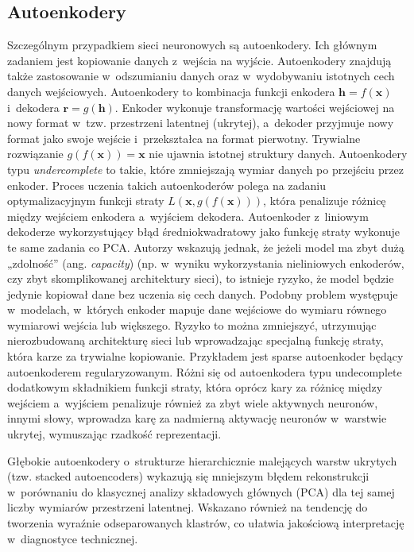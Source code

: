\subsection{Autoenkodery}

Szczególnym przypadkiem sieci neuronowych są autoenkodery. Ich głównym zadaniem jest kopiowanie danych z~wejścia na wyjście. Autoenkodery znajdują także zastosowanie w~odszumianiu danych oraz w~wydobywaniu istotnych cech danych wejściowych. Autoenkodery to kombinacja funkcji enkodera $\mathbf{h} = f(\mathbf{x})$ i~dekodera $\mathbf{r} = g(\mathbf{h})$. Enkoder wykonuje transformację wartości wejściowej na nowy format w~tzw. przestrzeni latentnej (ukrytej), a~dekoder przyjmuje nowy format jako swoje wejście i~przekształca na format pierwotny.
Trywialne rozwiązanie $g(f(\mathbf{x}))=\mathbf{x}$ nie ujawnia istotnej struktury danych. 
Autoenkodery typu \textit{undercomplete} to takie, które zmniejszają wymiar danych po przejściu przez enkoder. Proces uczenia takich autoenkoderów polega na zadaniu optymalizacyjnym funkcji straty $L(\mathbf{x},g(f(\mathbf{x})))$, która penalizuje różnicę między wejściem enkodera a~wyjściem dekodera. Autoenkoder z~liniowym dekoderze wykorzystujący błąd średniokwadratowy jako funkcję straty wykonuje te same zadania co PCA.
Autorzy \cite{deeplearningbook} wskazują jednak, że jeżeli model ma zbyt dużą „zdolność” (ang. \textit{capacity}) (np. w~wyniku wykorzystania nieliniowych enkoderów, czy zbyt skomplikowanej architektury sieci), to istnieje ryzyko, że model będzie jedynie kopiował dane bez uczenia się cech danych. Podobny problem występuje w~modelach, w~których enkoder mapuje dane wejściowe do wymiaru równego wymiarowi wejścia lub większego. Ryzyko to można zmniejszyć, utrzymując nierozbudowaną architekturę sieci lub wprowadzając specjalną funkcję straty, która karze za trywialne kopiowanie. 
Przykładem jest sparse autoenkoder będący autoenkoderem regularyzowanym. 
Różni się od autoenkodera typu undecomplete dodatkowym składnikiem funkcji straty, która oprócz kary za różnicę między wejściem a~wyjściem penalizuje również za zbyt wiele aktywnych neuronów, innymi słowy, wprowadza karę za nadmierną aktywację neuronów w~warstwie ukrytej, wymuszając rzadkość reprezentacji.

Głębokie autoenkodery o~strukturze hierarchicznie malejących warstw ukrytych (tzw. stacked autoencoders) wykazują się mniejszym błędem rekonstrukcji w~porównaniu do klasycznej analizy składowych głównych (PCA) dla tej samej liczby wymiarów przestrzeni latentnej. Wskazano również na tendencję do tworzenia wyraźnie odseparowanych klastrów, co ułatwia jakościową interpretację w~diagnostyce technicznej.

